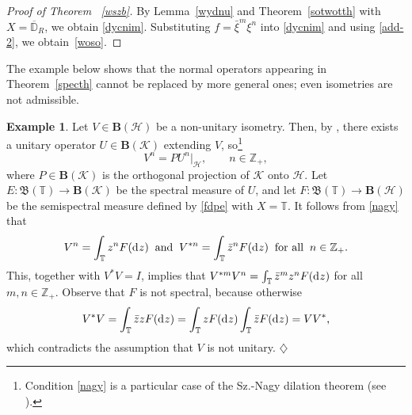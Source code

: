\documentclass[reqno]{amsproc}
\numberwithin{equation}{section}
\theoremstyle{remark}
\newcommand*{\hh}{\mathcal{H}}
\newcommand*{\kk}{\mathcal{K}}
\newcommand*{\borel}{\mathfrak{B}}
\newcommand*{\D}{\mathrm{d\hspace{.1ex}}}
\theoremstyle{definition}
\newtheorem{ex}[theorem]{Example}
\newcommand*{\ogr}{\boldsymbol{B}}
\newcommand*{\zbb}{\mathbb{Z}}
\newcommand*{\tbb}{\mathbb{T}}
\begin{document}
   \begin{proof}[Proof of Theorem~ \ref{wszb}]
By Lemma~\ref{wydnu} and Theorem~\ref{sotwotth} with
$X=\overline{\mathbb{D}}_R$, we obtain \eqref{dycnim}.
Substituting $f=\bar\xi^{m}\xi^{n}$ into
\eqref{dycnim} and using \eqref{add-2}, we
obtain~\eqref{woso}.
   \end{proof}
The example below shows that the normal operators
appearing in Theorem~\ref{specth} cannot be replaced
by more general ones; even isometries are not
admissible.
   \begin{ex} \label{isuszn}
Let $V\in \ogr(\hh)$ be a non-unitary isometry. Then,
by \cite[Proposition~I.2.3]{SF70}, there exists a
unitary operator $U\in \ogr(\kk)$ extending $V$,
so\footnote{Condition \eqref{nagy} is a particular
case of the Sz.-Nagy dilation theorem (see
\cite[Theorem~I.4.2]{SF70}).}
   \begin{equation}\label{nagy}
V^n=PU^n|_\hh, \qquad n\in \zbb_+,
   \end{equation}
where $P\in \ogr(\kk)$ is the orthogonal projection of
$\kk$ onto $\hh$. Let $E\colon \borel(\mathbb{T}) \to
\ogr(\kk)$ be the spectral measure of $U$, and let
$F\colon \borel(\tbb) \to \ogr(\hh)$ be the
semispectral measure defined by \eqref{fdpe} with
$X=\tbb$. It follows from \eqref{nagy} that
   \begin{equation*}
V^n=\int_{\tbb} z^n F(\D z) \;\; \text{and} \;\;
V^{*n}=\int_{\tbb} \bar z^n F(\D z) \;\; \text{for
all} \;\; n\in\zbb_+.
   \end{equation*}
This, together with $V^*V=I$, implies that $V^{*m}V^n=
\int_{\tbb} \bar{z}^m z^n F(\D z)$ for all $m,n \in
\zbb_+$. Observe that $F$ is not spectral, because
otherwise
   \begin{equation*}
V^{*}V= \int_{\tbb} \bar{z}z F(\D z)=\int_{\tbb} z
F(\D z)\int_{\tbb} \bar{z} F(\D z)= VV^{*},
   \end{equation*}
which contradicts the assumption that $V$ is not
unitary.
   \hfill $\diamondsuit$
   \end{ex}
\end{document}
